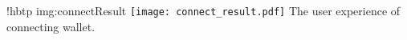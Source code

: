 \namedfigure
{!hbtp}
{img:connectResult}
{\texttt{[image: connect\_result.pdf]}}
{The user experience of connecting wallet.}
